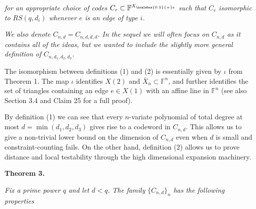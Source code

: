 \documentclass[10pt,a4paper]{article}
\begin{document}
\emph{for an appropriate choice of codes $C_{e}\subset\mathbb{F}^{{X}_{\scalebox{0.5}{+}e}}$ such that $C_{e}$ isomorphic to $RS(q,d_{i})$ whenever $e$ is an edge of type $i$.}\par




\emph{We also denote $C_{n,d}=C_{n,d,d,d}$. In the sequel we will often focus on $C_{n,d}$ as it contains all of the ideas, but we wanted to include the slightly more general definition of $C_{n,d_{1},d_{2},d_{3}}$.}\par






The isomorphism between definitions (1) and (2) is essentially given by $\iota$ from Theorem 1.
The map $\iota$ identifies $X(2)$ and $\bar{X}_{n}\subset\mathbb{F}^{n}$, and further identifies the set of triangles containing an edge $e\in X(1)$ with an affine line in $\mathbb{F}^{n}$ (see also Section 3.4
and Claim 25 for a full proof).\par




By definition (1) we can see that every $n$-variate polynomial of total degree at most $d=\min(d_{1},d_{2},d_{3})$ gives rise to a codeword in $C_{n,d}$. This allows us to give a non-trivial lower bound on the dimension of $C_{n,d}$ even when $d$ is small and constraint-counting fails. On the other hand, definition (2) allows us to prove distance and local testability through the high dimensional expansion machinery.\par






\par\medskip\noindent\textbf{
\textbf{Theorem 3}\textbf{.}
}\par



\emph{Fix a prime power $q$ and let $d<q$. The family $\{C_{n,d}\}_{n}$ has the following properties}\par
\end{document}
